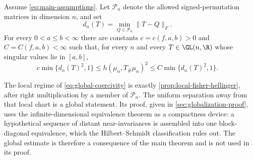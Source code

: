 \begin{theorem}
\label{thm:global-coercivity}
Assume \eqref{eq:main-assumptions}.  Let \(\mathcal P_n\) denote the allowed
signed-permutation matrices in dimension \(n\), and set
\begin{equation}
 d_n(T)=\min_{Q\in\mathcal P_n}\|T-Q\|_F.
 \label{eq:distance-stabilizer}
\end{equation}
For every \(0<a\le b<\infty\)
there are constants \(c=c(f,a,b)>0\) and \(C=C(f,a,b)<\infty\) such
that, for every \(n\) and every \(T\in\GL(n,\R)\) whose singular
values lie in \([a,b]\),
\begin{equation}
 c\min\{d_n(T)^2,1\}
 \le h(\mu_n,T_\#\mu_n)^2
 \le C\min\{d_n(T)^2,1\}.
 \label{eq:global-coercivity}
\end{equation}
\end{theorem}

The local regime of \eqref{eq:global-coercivity} is exactly
\cref{prop:local-fisher-hellinger}, after right multiplication by a member of
\(\mathcal P_n\).  The uniform separation away from that local chart is a
global statement.  Its proof, given in
\cref{sec:globalization-proof}, uses the infinite-dimensional equivalence
theorem as a compactness device: a hypothetical sequence of distant
near-invariances is assembled into one block-diagonal equivalence, which the
Hilbert--Schmidt classification rules out.  The global estimate is therefore
a consequence of the main theorem and is not used in its proof.
